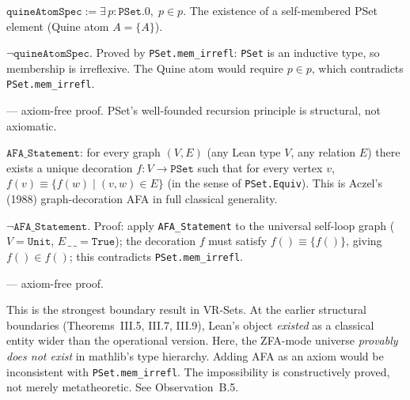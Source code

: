 \begin{definition}
\label{def:quineAtomSpec}
\leanok
$\texttt{quineAtomSpec} := \exists\, p : \texttt{PSet}.{0},\; p \in p$.
The existence of a self-membered PSet element (Quine atom $A = \{A\}$).
\end{definition}

\begin{theorem}
\label{thm:quineAtom_impossible}
\leanok
{}
$\lnot\texttt{quineAtomSpec}$.
Proved by \texttt{PSet.mem\_irrefl}: \texttt{PSet} is an inductive type,
so membership is irreflexive.  The Quine atom would require $p \in p$,
which contradicts \texttt{PSet.mem\_irrefl}.

\noindent\axiomprofile{[]} --- axiom-free proof.  PSet's well-founded
recursion principle is structural, not axiomatic.
\end{theorem}

\begin{definition}
\label{def:AFA_Statement}
\leanok
$\texttt{AFA\_Statement}$: for every graph $(V, E)$ (any Lean type $V$,
any relation $E$) there exists a unique decoration $f : V \to
\texttt{PSet}$ such that for every vertex $v$,
$f(v) \equiv \{f(w) \mid (v,w) \in E\}$ (in the sense of
\texttt{PSet.Equiv}).
This is Aczel's (1988) graph-decoration AFA in full classical generality.
\end{definition}

\begin{theorem}
\label{thm:AFA_Refuted}
\leanok
{}
$\lnot\texttt{AFA\_Statement}$.
Proof: apply \texttt{AFA\_Statement} to the universal self-loop graph
($V = \texttt{Unit}$, $E\,\_\,\_ = \texttt{True}$); the decoration $f$
must satisfy $f() \equiv \{f()\}$, giving $f() \in f()$; this
contradicts \texttt{PSet.mem\_irrefl}.

\noindent\axiomprofile{[]} --- axiom-free proof.

\begin{remark}
\label{rem:AFA_strongest_boundary}
\leanok
This is the strongest boundary result in VR-Sets.  At the earlier
structural boundaries (Theorems~III.5, III.7, III.9), Lean's object
\emph{existed} as a classical entity wider than the operational version.
Here, the ZFA-mode universe \emph{provably does not exist} in mathlib's
type hierarchy.  Adding AFA as an axiom would be inconsistent with
\texttt{PSet.mem\_irrefl}.  The impossibility is constructively proved,
not merely metatheoretic.  See Observation~B.5.
\end{remark}
\end{theorem}

